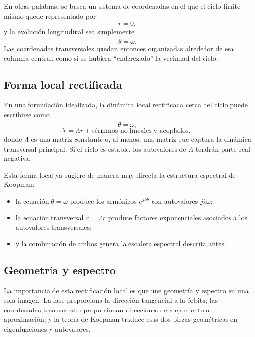 En otras palabras, se busca un sistema de coordenadas en el que el ciclo límite mismo quede representado por
\[
r=0,
\]
y la evolución longitudinal sea simplemente
\[
\dot{\theta}=\omega.
\]
Las coordenadas transversales quedan entonces organizadas alrededor de esa columna central, como si se hubiera ``enderezado'' la vecindad del ciclo.

\subsection{Forma local rectificada}

En una formulación idealizada, la dinámica local rectificada cerca del ciclo puede escribirse como
\begin{equation}
\dot{\theta}=\omega,
\label{eq:Koopman_tube_straight_theta}
\end{equation}
\begin{equation}
\dot{r}=\Lambda r+\text{términos no lineales y acoplados},
\label{eq:Koopman_tube_straight_r}
\end{equation}
donde \(\Lambda\) es una matriz constante o, al menos, una matriz que captura la dinámica transversal principal. Si el ciclo es estable, los autovalores de \(\Lambda\) tendrán parte real negativa.

Esta forma local ya sugiere de manera muy directa la estructura espectral de Koopman:
\begin{itemize}
\item la ecuación \(\dot{\theta}=\omega\) produce los armónicos \(e^{jk\theta}\) con autovalores \(jk\omega\);
\item la ecuación transversal \(\dot{r}=\Lambda r\) produce factores exponenciales asociados a los autovalores transversales;
\item y la combinación de ambos genera la escalera espectral descrita antes.
\end{itemize}

\subsection{Geometría y espectro}

La importancia de esta rectificación local es que une geometría y espectro en una sola imagen. La fase proporciona la dirección tangencial a la órbita; las coordenadas transversales proporcionan direcciones de alejamiento o aproximación; y la teoría de Koopman traduce esas dos piezas geométricas en eigenfunciones y autovalores.

